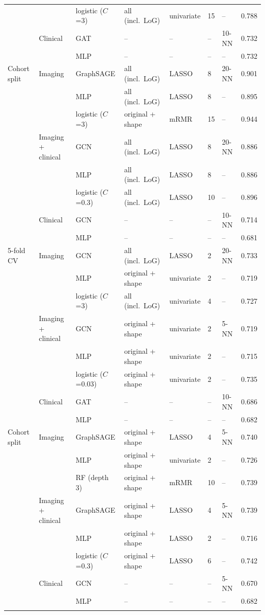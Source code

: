 \begin{tabularx}{\linewidth}{Q{2.0cm} Q{2.6cm} Q{2.6cm} J Q{1.7cm} P{0.6cm} P{1.2cm} P{1.4cm}}
 & & logistic ($C$=3) & all (incl.\ LoG) & univariate & 15 & -- & 0.788 \\
 & Clinical & GAT & -- & -- & -- & 10-NN & 0.732 \\
 &  & MLP & -- & -- & -- & -- & 0.732 \\
Cohort split & Imaging & GraphSAGE & all (incl.\ LoG) & LASSO & 8 & 20-NN & 0.901 \\
 &  & MLP & all (incl.\ LoG) & LASSO & 8 & -- & 0.895 \\
 & & logistic ($C$=3) & original + shape & mRMR & 15 & -- & 0.944 \\
 & Imaging + clinical & GCN & all (incl.\ LoG) & LASSO & 8 & 20-NN & 0.886 \\
 &  & MLP & all (incl.\ LoG) & LASSO & 8 & -- & 0.886 \\
 & & logistic ($C$=0.3) & all (incl.\ LoG) & LASSO & 10 & -- & 0.896 \\
 & Clinical & GCN & -- & -- & -- & 10-NN & 0.714 \\
 &  & MLP & -- & -- & -- & -- & 0.681 \\
5-fold CV & Imaging & GCN & all (incl.\ LoG) & LASSO & 2 & 20-NN & 0.733 \\
 &  & MLP & original + shape & univariate & 2 & -- & 0.719 \\
 & & logistic ($C$=3) & all (incl.\ LoG) & univariate & 4 & -- & 0.727 \\
 & Imaging + clinical & GCN & original + shape & univariate & 2 & 5-NN & 0.719 \\
 &  & MLP & original + shape & univariate & 2 & -- & 0.715 \\
 & & logistic ($C$=0.03) & original + shape & univariate & 2 & -- & 0.735 \\
 & Clinical & GAT & -- & -- & -- & 10-NN & 0.686 \\
 &  & MLP & -- & -- & -- & -- & 0.682 \\
Cohort split & Imaging & GraphSAGE & original + shape & LASSO & 4 & 5-NN & 0.740 \\
 &  & MLP & original + shape & univariate & 2 & -- & 0.726 \\
 & & RF (depth 3) & original + shape & mRMR & 10 & -- & 0.739 \\
 & Imaging + clinical & GraphSAGE & original + shape & LASSO & 4 & 5-NN & 0.739 \\
 &  & MLP & original + shape & LASSO & 2 & -- & 0.716 \\
 & & logistic ($C$=0.3) & original + shape & LASSO & 6 & -- & 0.742 \\
 & Clinical & GCN & -- & -- & -- & 5-NN & 0.670 \\
 &  & MLP & -- & -- & -- & -- & 0.682 \\
\botrule
\end{tabularx}
